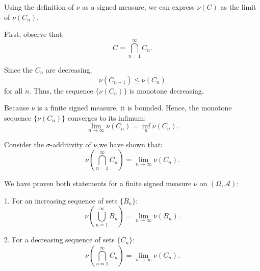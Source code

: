\documentclass{report}
\begin{document}
\begin{myproof}
Using the definition of \(\nu\) as a signed measure, we can express \(\nu(C)\) as the limit of \(\nu(C_n)\).

First, observe that:
\[ C = \bigcap_{n=1}^\infty C_n. \]

Since the \(C_n\) are decreasing,
\[ \nu(C_{n+1}) \leq \nu(C_n) \]
for all \(n\). Thus, the sequence \(\{\nu(C_n)\}\) is monotone decreasing.

Because \(\nu\) is a finite signed measure, it is bounded. Hence, the monotone sequence \(\{\nu(C_n)\}\) converges to its infimum:
\[ \lim_{n \to \infty} \nu(C_n) = \inf_n \nu(C_n). \]

Consider the \(\sigma\)-additivity of \(\nu\),we have shown that:
\[ \nu\left(\bigcap_{n=1}^\infty C_n\right) = \lim_{n \to \infty} \nu(C_n). \]

We have proven both statements for a finite signed measure \(\nu\) on \((\Omega, \mathcal{A})\):

1. For an increasing sequence of sets \(\{B_n\}\):
\[ \nu\left(\bigcup_{n=1}^\infty B_n\right) = \lim_{n \to \infty} \nu(B_n). \]

2. For a decreasing sequence of sets \(\{C_n\}\):
\[ \nu\left(\bigcap_{n=1}^\infty C_n\right) = \lim_{n \to \infty} \nu(C_n). \]
\end{myproof}
\end{document}

